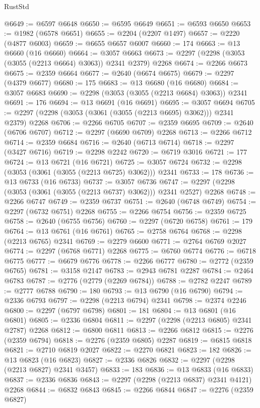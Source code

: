 \begin{lexlean}{RustStd}
\begin{coremodule}
{\begin{coremodule}
{{{{{{{{{{{{{{{{{{{{{{{{{{{{{{{{{{{{{{{{{{{{{{{{{{{{{{@6649 := @6597 @6648
@6650 := @6595 @6649
@6651 := @6593 @6650
@6653 := @1982 (@6578 @6651)
@6655 := @2204 (@2207 @1497)
@6657 := @2220 (@4877 @6003)
@6659 := @6655 @6657 @6007
@6660 := 174
@6663 := @13 @6660 (@16 @6660)
@6664 := @3057 @6663
@6673 := @2297 (@2298 (@3053 (@3055 (@2213 @6664) @3063)) @2341 @2379) @2268
@6674 := @2266 @6673
@6675 := @2359 @6664
@6677 := @2640 (@6674 @6675)
@6679 := @2297 (@4379 @6677)
@6680 := 175
@6683 := @13 @6680 (@16 @6680)
@6684 := @3057 @6683
@6690 := @2298 (@3053 (@3055 (@2213 @6684) @3063)) @2341
@6691 := 176
@6694 := @13 @6691 (@16 @6691)
@6695 := @3057 @6694
@6705 := @2297 (@2298 (@3053 (@3061 (@3055 (@2213 @6695) @3062))) @2341 @2379) @2268
@6706 := @2266 @6705
@6707 := @2359 @6695
@6709 := @2640 (@6706 @6707)
@6712 := @2297 (@6690 @6709) @2268
@6713 := @2266 @6712
@6714 := @2359 @6684
@6716 := @2640 (@6713 @6714)
@6718 := @2297 (@3427 @6716)
@6719 := @2298 @2242
@6720 := @6719 @3016
@6721 := 177
@6724 := @13 @6721 (@16 @6721)
@6725 := @3057 @6724
@6732 := @2298 (@3053 (@3061 (@3055 (@2213 @6725) @3062))) @2341
@6733 := 178
@6736 := @13 @6733 (@16 @6733)
@6737 := @3057 @6736
@6747 := @2297 (@2298 (@3053 (@3061 (@3055 (@2213 @6737) @3062))) @2341 @2527) @2268
@6748 := @2266 @6747
@6749 := @2359 @6737
@6751 := @2640 (@6748 @6749)
@6754 := @2297 (@6732 @6751) @2268
@6755 := @2266 @6754
@6756 := @2359 @6725
@6758 := @2640 (@6755 @6756)
@6760 := @2297 (@6720 @6758)
@6761 := 179
@6764 := @13 @6761 (@16 @6761)
@6765 := @2758 @6764
@6768 := @2298 (@2213 @6765) @2341
@6769 := @2279 @6600
@6771 := @2764 @6769 @2027
@6774 := @2297 (@6768 @6771) @2268
@6775 := @6760 @6774
@6776 := @6718 @6775
@6777 := @6679 @6776
@6778 := @2266 @6777
@6780 := @2772 (@2359 @6765)
@6781 := @3158 @2147
@6783 := @2943 @6781 @2287
@6784 := @2464 @6783
@6787 := @2776 (@2779 (@2269 @6784))
@6788 := @2782 @2247
@6789 := @2777 @6788
@6790 := 180
@6793 := @13 @6790 (@16 @6790)
@6794 := @2336 @6793
@6797 := @2298 (@2213 @6794) @2341
@6798 := @2374 @2246
@6800 := @2297 (@6797 @6798)
@6801 := 181
@6804 := @13 @6801 (@16 @6801)
@6805 := @2336 @6804
@6811 := @2297 (@2298 (@2213 @6805) @2341 @2787) @2268
@6812 := @6800 @6811
@6813 := @2266 @6812
@6815 := @2276 (@2359 @6794)
@6818 := @2276 (@2359 @6805) @2287
@6819 := @6815 @6818
@6821 := @2710 @6819 @2027
@6822 := @2270 @6821
@6823 := 182
@6826 := @13 @6823 (@16 @6823)
@6827 := @2336 @6826
@6832 := @2297 (@2298 (@2213 @6827) @2341 @3457)
@6833 := 183
@6836 := @13 @6833 (@16 @6833)
@6837 := @2336 @6836
@6843 := @2297 (@2298 (@2213 @6837) @2341 @4121) @2268
@6844 := @6832 @6843
@6845 := @2266 @6844
@6847 := @2276 (@2359 @6827)
}}}}}}}}}}}}}}}}}}}}}}}}}}}}}}}}}}}}}}}}}}}}}}}}}}}}}}
\end{coremodule}}
\end{coremodule}
\end{lexlean}
